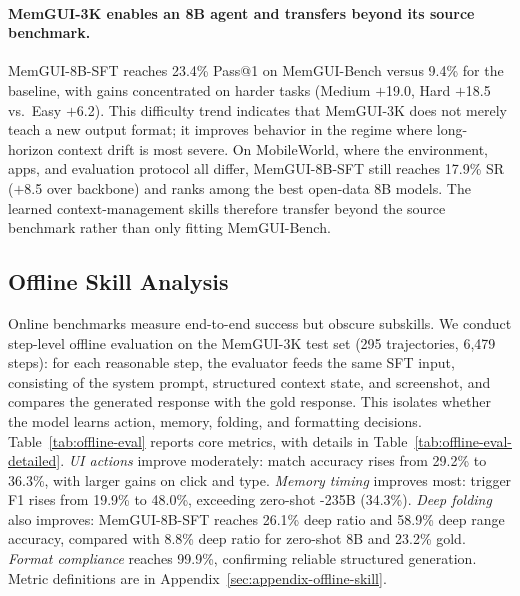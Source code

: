 

\paragraph{MemGUI-3K enables an 8B agent and transfers beyond its source benchmark.}
MemGUI-8B-SFT reaches 23.4\% Pass@1 on MemGUI-Bench versus 9.4\% for the  baseline, with gains concentrated on harder tasks (Medium $+$19.0, Hard $+$18.5 vs.\ Easy $+$6.2). This difficulty trend indicates that MemGUI-3K does not merely teach a new output format; it improves behavior in the regime where long-horizon context drift is most severe. On MobileWorld, where the environment, apps, and evaluation protocol all differ, MemGUI-8B-SFT still reaches 17.9\% SR ($+$8.5 over backbone) and ranks among the best open-data 8B models. The learned context-management skills therefore transfer beyond the source benchmark rather than only fitting MemGUI-Bench.

\vspace{-0.25em}
\subsection{Offline Skill Analysis}
\label{sec:offline-skill-analysis}
\vspace{-0.55em}


\vspace{-0.15em}

Online benchmarks measure end-to-end success but obscure subskills. We conduct step-level offline evaluation on the MemGUI-3K test set (295 trajectories, 6{,}479 steps): for each reasonable step, the evaluator feeds the same SFT input, consisting of the system prompt, structured context state, and screenshot, and compares the generated response with the gold response. This isolates whether the model learns action, memory, folding, and formatting decisions. Table~\ref{tab:offline-eval} reports core metrics, with details in Table~\ref{tab:offline-eval-detailed}. \emph{UI actions} improve moderately: match accuracy rises from 29.2\% to 36.3\%, with larger gains on click and type. \emph{Memory timing} improves most: trigger F1 rises from 19.9\% to 48.0\%, exceeding zero-shot \ourmethod-235B (34.3\%). \emph{Deep folding} also improves: MemGUI-8B-SFT reaches 26.1\% deep ratio and 58.9\% deep range accuracy, compared with 8.8\% deep ratio for zero-shot 8B and 23.2\% gold. \emph{Format compliance} reaches 99.9\%, confirming reliable structured generation. Metric definitions are in Appendix~\ref{sec:appendix-offline-skill}.

